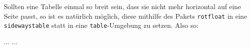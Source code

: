 %
%
%
%
%
%
%
%
%
%
%
%
%
%
Sollten eine Tabelle einmal so breit sein, dass sie nicht mehr horizontal auf
eine Seite passt, so ist es natürlich möglich, diese mithilfe des Pakets
\texttt{rotfloat} \parencite{Sommerfeldt2004} in eine
\texttt{sidewaystable} statt in eine \texttt{table}-Umgebung zu setzen.
Also so:
\begin{latex}[caption={Gedrehte Tabelle},label={lst:rotated-table}]
\begin{sidewaystable}
  \centering%
  \begin{tabular}{...}%
    ...
  \end{tabular}%
  \caption{Bezeichnung}%
  \label{Referenzmarke}%
\end{sidewaystable}%
\end{latex}

